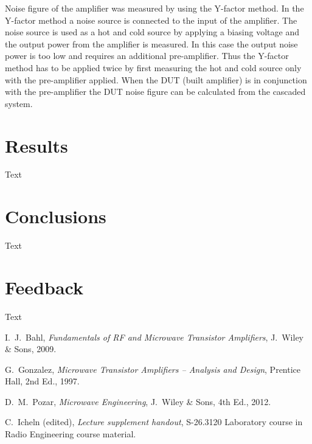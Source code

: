 \documentclass[a4paper, 12pt]{article}
\begin{document}
Noise figure of the amplifier was measured by using the Y-factor method. In the Y-factor method a noise source is connected to the input of the amplifier. The noise source is used as a hot and cold source by applying a biasing voltage and the output power from the amplifier is measured. In this case the output noise power is too low and requires an additional pre-amplifier. Thus the Y-factor method has to be applied twice by first measuring the hot and cold source only with the pre-amplifier applied. When the DUT (built amplifier) is in conjunction with the pre-amplifier the DUT noise figure can be calculated from the cascaded system.



\newpage
\section{Results}

Text

\newpage
\section{Conclusions}

Text

\newpage
\section{Feedback}

Text


\newpage
\begin{thebibliography}{9}%
	
 I.\ J.\ Bahl, 
	\textit{Fundamentals of RF and Microwave Transistor Amplifiers},
	J.\ Wiley \& Sons, 2009.

 G.\ Gonzalez, 
	\textit{Microwave Transistor Amplifiers -- Analysis and Design},
	Prentice Hall, 2nd Ed., 1997.
	
 D.\ M.\ Pozar, 
	\textit{Microwave Engineering}, 
	J.\ Wiley \& Sons, 4th Ed., 2012.
	
 C.\ Icheln (edited), 
	\textit{Lecture supplement handout},
	S-26.3120 Laboratory course in Radio Engineering course material.

\end{thebibliography}
\end{document}
